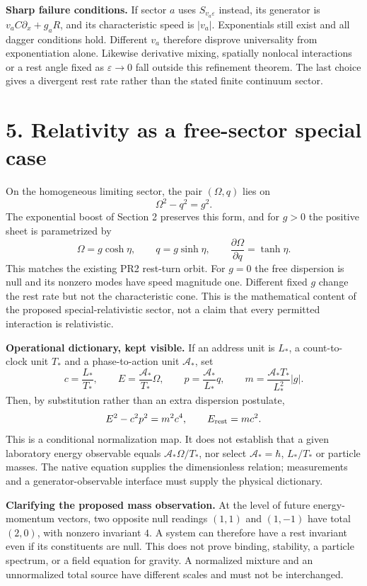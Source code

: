 \documentclass[11pt,a4paper]{article}
\begin{document}
\textbf{Sharp failure conditions.} If sector $a$ uses $S_{v_a\varepsilon}$ instead, its generator is $v_aC\partial_x+g_aR$, and its characteristic speed is $|v_a|$. Exponentials still exist and all dagger conditions hold. Different $v_a$ therefore disprove universality from exponentiation alone. Likewise derivative mixing, spatially nonlocal interactions or a rest angle fixed as $\varepsilon\to0$ fall outside this refinement theorem. The last choice gives a divergent rest rate rather than the stated finite continuum sector.

\newpage
\section*{5. Relativity as a free-sector special case}
On the homogeneous limiting sector, the pair $(\Omega,q)$ lies on
\[
\Omega^2-q^2=g^2.
\]
The exponential boost of Section 2 preserves this form, and for $g>0$ the positive sheet is parametrized by
\[
\Omega=g\cosh\eta,\qquad q=g\sinh\eta,\qquad
\frac{\partial\Omega}{\partial q}=\tanh\eta.
\]
This matches the existing PR2 rest-turn orbit. For $g=0$ the free dispersion is null and its nonzero modes have speed magnitude one. Different fixed $g$ change the rest rate but not the characteristic cone. This is the mathematical content of the proposed special-relativistic sector, not a claim that every permitted interaction is relativistic.

\textbf{Operational dictionary, kept visible.} If an address unit is $L_*$, a count-to-clock unit $T_*$ and a phase-to-action unit $\mathcal A_*$, set
\[
c=\frac{L_*}{T_*},\qquad
E=\frac{\mathcal A_*}{T_*}\Omega,\qquad
p=\frac{\mathcal A_*}{L_*}q,\qquad
m=\frac{\mathcal A_*T_*}{L_*^2}|g|.
\]
Then, by substitution rather than an extra dispersion postulate,
\[
E^2-c^2p^2=m^2c^4,\qquad E_{\rm rest}=mc^2.
\]
This is a conditional normalization map. It does not establish that a given laboratory energy observable equals $\mathcal A_*\Omega/T_*$, nor select $\mathcal A_*=\hbar$, $L_*/T_*$ or particle masses. The native equation supplies the dimensionless relation; measurements and a generator-observable interface must supply the physical dictionary.

\textbf{Clarifying the proposed mass observation.} At the level of future energy-momentum vectors, two opposite null readings $(1,1)$ and $(1,-1)$ have total $(2,0)$, with nonzero invariant $4$. A system can therefore have a rest invariant even if its constituents are null. This does not prove binding, stability, a particle spectrum, or a field equation for gravity. A normalized mixture and an unnormalized total source have different scales and must not be interchanged.
\end{document}
